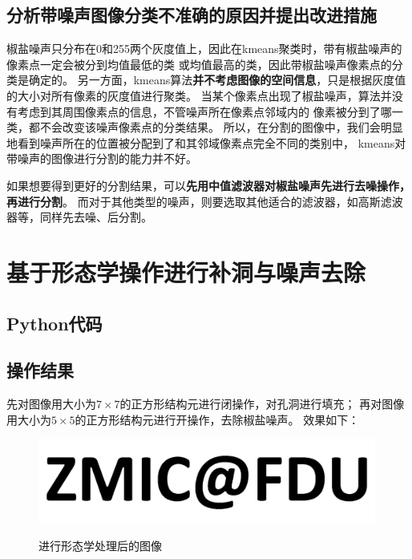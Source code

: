 \documentclass{article}
\begin{document}
\subsection{分析带噪声图像分类不准确的原因并提出改进措施}
椒盐噪声只分布在0和255两个灰度值上，因此在kmeans聚类时，带有椒盐噪声的像素点一定会被分到均值最低的类
或均值最高的类，因此带椒盐噪声像素点的分类是确定的。
另一方面，kmeans算法\textbf{并不考虑图像的空间信息}，只是根据灰度值的大小对所有像素的灰度值进行聚类。
当某个像素点出现了椒盐噪声，算法并没有考虑到其周围像素点的信息，不管噪声所在像素点邻域内的
像素被分到了哪一类，都不会改变该噪声像素点的分类结果。
所以，在分割的图像中，我们会明显地看到噪声所在的位置被分配到了和其邻域像素点完全不同的类别中，
kmeans对带噪声的图像进行分割的能力并不好。

如果想要得到更好的分割结果，可以\textbf{先用中值滤波器对椒盐噪声先进行去噪操作，再进行分割}。
而对于其他类型的噪声，则要选取其他适合的滤波器，如高斯滤波器等，同样先去噪、后分割。

\newpage
\section{基于形态学操作进行补洞与噪声去除}
\subsection{Python代码}
 
\subsection{操作结果}

先对图像用大小为$7\times 7$的正方形结构元进行闭操作，对孔洞进行填充；
再对图像用大小为$5 \times 5$的正方形结构元进行开操作，去除椒盐噪声。
效果如下：


\begin{figure}[H]
	\centering
	{\includegraphics[width=0.99\textwidth]{exercise2_result//result.png}} 
	\caption{进行形态学处理后的图像}
\end{figure}
\end{document}
